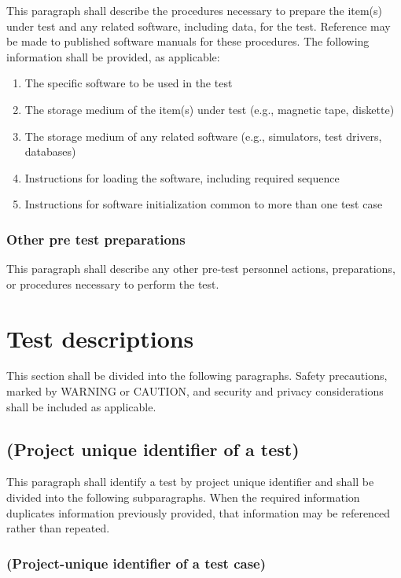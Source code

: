 \documentclass{fidata-report-template}
\begin{document}
This paragraph shall describe the procedures necessary to prepare the
item(s) under test and any related software, including data, for the
test. Reference may be made to published software manuals for these
procedures. The following information shall be provided, as applicable:

\begin{enumerate}
\itemsep1pt\parskip0pt
\item
  The specific software to be used in the test
\item
  The storage medium of the item(s) under test (e.g., magnetic tape,
  diskette)
\item
  The storage medium of any related software (e.g., simulators, test
  drivers, databases)
\item
  Instructions for loading the software, including required sequence
\item
  Instructions for software initialization common to more than one test
  case
\end{enumerate}

\subsubsection{Other pre test preparations}

This paragraph shall describe any other pre-test personnel actions,
preparations, or procedures necessary to perform the test.

\section{Test descriptions}

This section shall be divided into the following paragraphs. Safety
precautions, marked by WARNING or CAUTION, and security and privacy
considerations shall be included as applicable.

\subsection{(Project unique identifier of a test)}

This paragraph shall identify a test by project unique identifier and
shall be divided into the following subparagraphs. When the required
information duplicates information previously provided, that information
may be referenced rather than repeated.

\subsubsection{(Project-unique identifier of a test case)}
\end{document}
